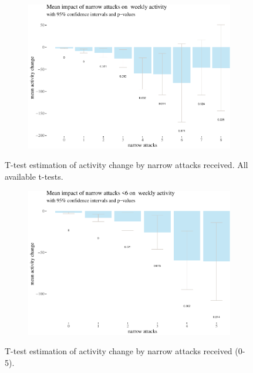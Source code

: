 \documentclass[10pt,]{scrartcl}
\begin{document}
\begin{figure}[h!]
\begin{subfigure}[t]{0.95\textwidth}

\begin{center}\includegraphics[width=1\linewidth]{redditAnalysisWalkthrough_files/figure-latex/unnamed-chunk-27-1} \end{center}
\end{subfigure}
\caption{T-test estimation of activity change by narrow attacks received. All available t-tests.}
\label{fig:highbar}
\end{figure}

\begin{figure}[h!]
\begin{subfigure}[t]{0.95\textwidth}

\begin{center}\includegraphics[width=1\linewidth]{redditAnalysisWalkthrough_files/figure-latex/unnamed-chunk-28-1} \end{center}
\end{subfigure}
\caption{T-test estimation of activity change by narrow attacks received (0-5).}
\label{fig:highbar6}
\end{figure}
\end{document}

